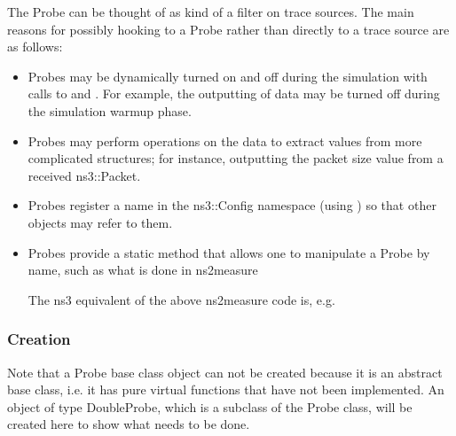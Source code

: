 \documentclass[letterpaper,10pt,english]{sphinxmanual}
\renewcommand{\sphinxcode}[1]{\texttt{\small{#1}}}
\begin{document}
The Probe can be thought of as kind of a filter on trace sources.  The
main reasons for possibly hooking to a Probe rather than directly to a
trace source are as follows:
\begin{itemize}
\item {} 
Probes may be dynamically turned on and off during the simulation
with calls to \sphinxcode{} and \sphinxcode{}.  For example, the
outputting of data may be turned off during the simulation warmup
phase.

\item {} 
Probes may perform operations on the data to extract values from more
complicated structures; for instance, outputting the packet size value
from a received ns3::Packet.

\item {} 
Probes register a name in the ns3::Config namespace (using
\sphinxcode{}) so that other objects may refer to them.

\item {} 
Probes provide a static method that allows one to manipulate a Probe
by name, such as what is done in ns2measure 

\begin{sphinxVerbatim}[commandchars=\\\{\}]
   
\end{sphinxVerbatim}

The ns\sphinxhyphen{}3 equivalent of the above ns2measure code is, e.g.

\begin{sphinxVerbatim}[commandchars=\\\{\}]
  
\end{sphinxVerbatim}

\end{itemize}


\subsubsection{Creation}
\label{\detokenize{probe:creation}}
Note that a Probe base class object can not be created because it
is an abstract base class, i.e. it has pure virtual functions that
have not been implemented.  An object of type DoubleProbe,
which is a subclass of the Probe class, will be created here to
show what needs to be done.
\end{document}
